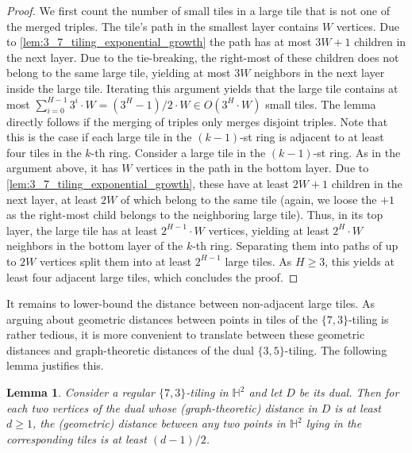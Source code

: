 \documentclass[11pt]{article}
\newtheorem{lemma}[theorem]{Lemma}
\newcommand{\Hyp}{\ensuremath{\mathbb{H}}\xspace}
\begin{document}
\begin{proof}
    We first count the number of small tiles in a large tile that is not one of the merged triples.
    The tile's path in the smallest layer contains $W$ vertices.
    Due to \cref{lem:3_7_tiling_exponential_growth} the path has at most $3W + 1$ children in the next layer.
    Due to the tie-breaking, the right-most of these children does not belong to the same large tile, yielding at most $3W$ neighbors in the next layer inside the large tile.
    Iterating this argument yields that the large tile contains at most $\sum_{i = 0}^{H - 1} 3^i \cdot W = (3^H - 1) / 2 \cdot W \in O(3^H \cdot W)$ small tiles.
%
    The lemma directly follows if the merging of triples only merges disjoint triples.
    Note that this is the case if each large tile in the $(k - 1)$-st ring is adjacent to at least four tiles in the $k$-th ring.
    Consider a large tile in the $(k - 1)$-st ring.
    As in the argument above, it has $W$ vertices in the path in the bottom layer.
    Due to \cref{lem:3_7_tiling_exponential_growth}, these have at least $2W + 1$ children in the next layer, at least $2W$ of which belong to the same tile (again, we loose the $+1$ as the right-most child belongs to the neighboring large tile).
    Thus, in its top layer, the large tile has at least $2^{H - 1}\cdot W$ vertices, yielding at least $2^H \cdot W$ neighbors in the bottom layer of the $k$-th ring.
    Separating them into paths of up to $2W$ vertices split them into at least $2^{H - 1}$ large tiles.
    As $H \ge 3$, this yields at least four adjacent large tiles, which concludes the proof.
\end{proof}
%
It remains to lower-bound the distance between non-adjacent large tiles.
As arguing about geometric distances between points in tiles of the $\{7, 3\}$-tiling is rather tedious, it is more convenient to translate between these geometric distances and graph-theoretic distances of the dual $\{3, 5\}$-tiling.
The following lemma justifies this.
%
\begin{lemma}\label{lem:geometric_graph_distances}
    Consider a regular $ \{ 7, 3 \} $-tiling in $ \Hyp^2 $ and let $ D $ be its dual.
    Then for each two vertices of the dual whose (graph-theoretic) distance in $ D $ is at least $d \geq 1 $, the (geometric) distance between any two points in $ \Hyp^2 $ lying in the corresponding tiles is at least $ (d - 1) / 2 $.
\end{lemma}
\end{document}
